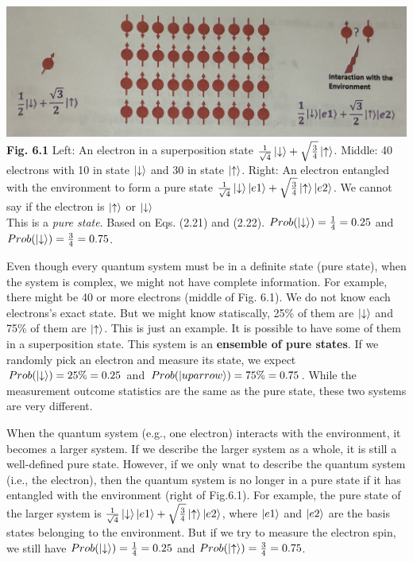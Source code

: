 \documentclass{article}
\begin{document}
\includegraphics[scale=0.4]{Fig 6.1.jpeg}\\
\textbf{Fig. 6.1} Left: An electron in a superposition state $\frac{1}{\sqrt{4}}\ket{\downarrow}+\sqrt{\frac{3}{4}}\ket{\uparrow}$.
Middle: 40 electrons with 10 in state $\ket{\downarrow}$ and 30 in state $\ket{\uparrow}$. Right: An electron entangled with the environment
to form a pure state $\frac{1}{\sqrt{4}}\ket{\downarrow}\ket{e1}+\sqrt{\frac{3}{4}}\ket{\uparrow}\ket{e2}$. We cannot say if the electron is 
$\ket{\uparrow}$ or $\ket{\downarrow}$\\

This is a \textit{pure state}. Based on Eqs. (2.21) and (2.22). $Prob(\ket{\downarrow})=\frac{1}{4}=0.25$ and
$Prob(\ket{\downarrow})=\frac{3}{4}=0.75$.

Even though every quantum system must be in a definite state (pure state), when
the system is complex, we might not have complete information. For example, there
might be 40 or more electrons (middle of Fig. 6.1). We do not know each electrons's
exact state. But we might know statiscally, 25\% of them are $\ket{\downarrow}$ and 75\%
of them are $\ket{\uparrow}$. This is just an example. It is possible to have some of them
in a superposition state. This system is an \textbf{ensemble of pure states}. If we randomly
pick an electron and measure its state, we expect $Prob(\ket{\downarrow}) = 25\%=0.25$ and 
$Prob(\ket{uparrow})= 75\%=0.75$. While the measurement outcome statistics are the same as the pure
state, these two systems are very different.

When the quantum system (e.g., one electron) interacts with the environment, it becomes a larger
system. If we describe the larger system as a whole, it is still a 
well-defined pure state. However, if we only wnat to describe the quantum system
(i.e., the electron), then the quantum system is no longer in a pure state if
it has entangled with the environment (right of Fig.6.1). For example, the pure state
of the larger system is $\frac{1}{\sqrt{4}}\ket{\downarrow}\ket{e1}+\sqrt{\frac{3}{4}}\ket{\uparrow}\ket{e2}$,
where $\ket{e1}$ and $\ket{e2}$ are the basis states belonging to the
environment. But if we try to measure the electron spin, we still have 
$Prob(\ket{\downarrow})=\frac{1}{4}=0.25$ and $Prob(\ket{\uparrow})=\frac{3}{4}=0.75$.
\end{document}
